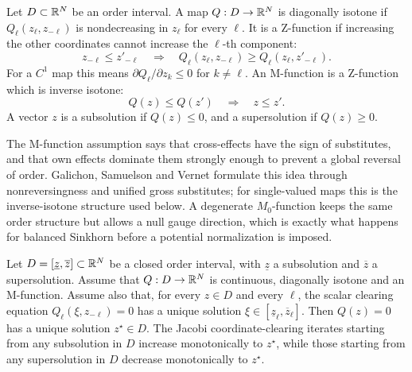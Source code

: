 \begin{defn}\label{def-mfunctions}
	Let \(D\subset\mathbb{R}^N\) be an order interval.  A map \(Q:D\to\mathbb{R}^N\) is diagonally isotone if \(Q_\ell(z_\ell,z_{-\ell})\) is nondecreasing in \(z_\ell\) for every \(\ell\).  It is a Z-function if increasing the other coordinates cannot increase the \(\ell\)-th component:
	\[
		z_{-\ell}\leq z'_{-\ell}
		\quad\Longrightarrow\quad
		Q_\ell(z_\ell,z_{-\ell})\geq Q_\ell(z_\ell,z'_{-\ell}).
	\]
	For a \(C^1\) map this means \(\partial Q_\ell/\partial z_k\leq0\) for \(k\neq\ell\).  An M-function is a Z-function which is inverse isotone:
	\[
		Q(z)\leq Q(z')
		\quad\Longrightarrow\quad
		z\leq z'.
	\]
	A vector \(z\) is a subsolution if \(Q(z)\leq0\), and a supersolution if \(Q(z)\geq0\).
\end{defn}

The M-function assumption says that cross-effects have the sign of substitutes, and that own effects dominate them strongly enough to prevent a global reversal of order.  Galichon, Samuelson and Vernet formulate this idea through nonreversingness and unified gross substitutes; for single-valued maps this is the inverse-isotone structure used below.  A degenerate \(M_0\)-function keeps the same order structure but allows a null gauge direction, which is exactly what happens for balanced Sinkhorn before a potential normalization is imposed.

\begin{thm}\label{thm-mfunction-jacobi-convergence}
	Let \(D=[\underline z,\overline z]\subset\mathbb{R}^N\) be a closed order interval, with \(\underline z\) a subsolution and \(\overline z\) a supersolution.  Assume that \(Q:D\to\mathbb{R}^N\) is continuous, diagonally isotone and an M-function.  Assume also that, for every \(z\in D\) and every \(\ell\), the scalar clearing equation \(Q_\ell(\xi,z_{-\ell})=0\) has a unique solution \(\xi\in[\underline z_\ell,\overline z_\ell]\).  Then \(Q(z)=0\) has a unique solution \(z^\star\in D\).  The Jacobi coordinate-clearing iterates starting from any subsolution in \(D\) increase monotonically to \(z^\star\), while those starting from any supersolution in \(D\) decrease monotonically to \(z^\star\).
\end{thm}

